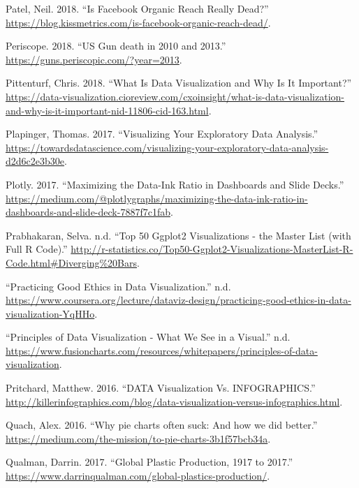 \documentclass[]{book}
\begin{document}
\leavevmode\hypertarget{ref-facebook_organic}{}%
Patel, Neil. 2018. ``Is Facebook Organic Reach Really Dead?'' \url{https://blog.kissmetrics.com/is-facebook-organic-reach-dead/}.

\leavevmode\hypertarget{ref-narratives_2017}{}%
Periscope. 2018. ``US Gun death in 2010 and 2013.'' \url{https://guns.periscopic.com/?year=2013}.

\leavevmode\hypertarget{ref-viz_importance}{}%
Pittenturf, Chris. 2018. ``What Is Data Visualization and Why Is It Important?'' \url{https://data-visualization.cioreview.com/cxoinsight/what-is-data-visualization-and-why-is-it-important-nid-11806-cid-163.html}.

\leavevmode\hypertarget{ref-Visualizing_DataAnalysis}{}%
Plapinger, Thomas. 2017. ``Visualizing Your Exploratory Data Analysis.'' \url{https://towardsdatascience.com/visualizing-your-exploratory-data-analysis-d2d6c2e3b30e}.

\leavevmode\hypertarget{ref-appli_2017}{}%
Plotly. 2017. ``Maximizing the Data-Ink Ratio in Dashboards and Slide Decks.'' \url{https://medium.com/@plotlygraphs/maximizing-the-data-ink-ratio-in-dashboards-and-slide-deck-7887f7c1fab}.

\leavevmode\hypertarget{ref-viz_R}{}%
Prabhakaran, Selva. n.d. ``Top 50 Ggplot2 Visualizations - the Master List (with Full R Code).'' \url{http://r-statistics.co/Top50-Ggplot2-Visualizations-MasterList-R-Code.html\#Diverging\%20Bars}.

\leavevmode\hypertarget{ref-Practicing_Good_Ethics_in_Data_Visualization}{}%
``Practicing Good Ethics in Data Visualization.'' n.d. \url{https://www.coursera.org/lecture/dataviz-design/practicing-good-ethics-in-data-visualization-YqHHo}.

\leavevmode\hypertarget{ref-fusioncharts}{}%
``Principles of Data Visualization - What We See in a Visual.'' n.d. \url{https://www.fusioncharts.com/resources/whitepapers/principles-of-data-visualization}.

\leavevmode\hypertarget{ref-VIZVSINFO}{}%
Pritchard, Matthew. 2016. ``DATA Visualization Vs. INFOGRAPHICS.'' \url{http://killerinfographics.com/blog/data-visualization-versus-infographics.html}.

\leavevmode\hypertarget{ref-quach-penny}{}%
Quach, Alex. 2016. ``Why pie charts often suck: And how we did better.'' \url{https://medium.com/the-mission/to-pie-charts-3b1f57bcb34a}.

\leavevmode\hypertarget{ref-global_plastic_production}{}%
Qualman, Darrin. 2017. ``Global Plastic Production, 1917 to 2017.'' \url{https://www.darrinqualman.com/global-plastics-production/}.
\end{document}
